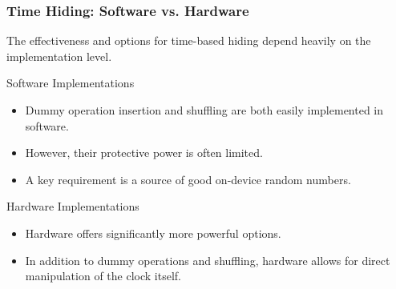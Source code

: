 \begin{frame}
    \frametitle{Time Hiding: Software vs. Hardware}

    The effectiveness and options for time-based hiding depend heavily on the implementation level.

    \begin{block}{Software Implementations}
        \begin{itemize}
            \item Dummy operation insertion and shuffling are both easily implemented in software.
            \item However, their protective power is often limited.
            \item A key requirement is a source of good on-device random numbers.
        \end{itemize}
    \end{block}

    \begin{block}{Hardware Implementations}
        \begin{itemize}
            \item Hardware offers significantly more powerful options.
            \item In addition to dummy operations and shuffling, hardware allows for direct manipulation of the clock itself.
        \end{itemize}
    \end{block}

\end{frame}

